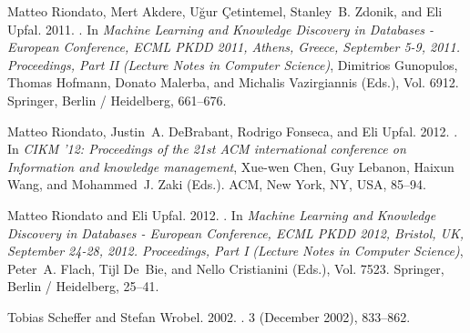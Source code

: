 \begin{thebibliography}{00}
{Matteo Riondato}, {Mert Akdere}, {U\u{g}ur \c{C}etintemel}, {Stanley~B.
  Zdonik}, {and} {Eli Upfal}. 2011.
\newblock {}. In {\em Machine Learning and Knowledge
  Discovery in Databases - European Conference, ECML PKDD 2011, Athens, Greece,
  September 5-9, 2011. Proceedings, Part II} {\em (Lecture Notes in Computer
  Science)}, {Dimitrios Gunopulos}, {Thomas Hofmann}, {Donato Malerba}, {and}
  {Michalis Vazirgiannis} (Eds.), Vol. 6912. Springer, Berlin / Heidelberg,
  661--676.


{Matteo Riondato}, {Justin~A. DeBrabant}, {Rodrigo Fonseca}, {and} {Eli Upfal}.
  2012.
\newblock {}. In {\em CIKM '12: Proceedings of
  the 21st ACM international conference on Information and knowledge
  management}, {Xue-wen Chen}, {Guy Lebanon}, {Haixun Wang}, {and} {Mohammed~J.
  Zaki} (Eds.). ACM, New York, NY, USA, 85--94.


{Matteo Riondato} {and} {Eli Upfal}. 2012.
\newblock {}. In
  {\em Machine Learning and Knowledge Discovery in Databases - European
  Conference, ECML PKDD 2012, Bristol, UK, September 24-28, 2012. Proceedings,
  Part I} {\em (Lecture Notes in Computer Science)}, {Peter~A. Flach}, {Tijl
  De~Bie}, {and} {Nello Cristianini} (Eds.), Vol. 7523. Springer, Berlin /
  Heidelberg, 25--41.


{Tobias Scheffer} {and} {Stefan Wrobel}. 2002.
\newblock {}.
  {3} (December 2002), 833--862.


\end{thebibliography}
